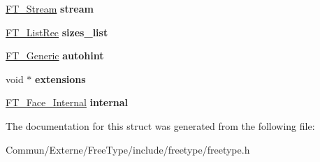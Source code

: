 \begin{DoxyCompactItemize}
\item 
\hyperlink{struct_f_t___stream_rec__}{F\+T\+\_\+\+Stream} {\bfseries stream}\hypertarget{struct_f_t___face_rec___a831d5da25cd0fe2a783d2a73f467de55}{}\label{struct_f_t___face_rec___a831d5da25cd0fe2a783d2a73f467de55}

\item 
\hyperlink{struct_f_t___list_rec__}{F\+T\+\_\+\+List\+Rec} {\bfseries sizes\+\_\+list}\hypertarget{struct_f_t___face_rec___a47504203e02bfba59c802c35cb4009ed}{}\label{struct_f_t___face_rec___a47504203e02bfba59c802c35cb4009ed}

\item 
\hyperlink{struct_f_t___generic__}{F\+T\+\_\+\+Generic} {\bfseries autohint}\hypertarget{struct_f_t___face_rec___a34ba9b1367f1b2d13676043b8da3ea73}{}\label{struct_f_t___face_rec___a34ba9b1367f1b2d13676043b8da3ea73}

\item 
void $\ast$ {\bfseries extensions}\hypertarget{struct_f_t___face_rec___a8b24f993e38da597d3e0273267890f49}{}\label{struct_f_t___face_rec___a8b24f993e38da597d3e0273267890f49}

\item 
\hyperlink{struct_f_t___face___internal_rec__}{F\+T\+\_\+\+Face\+\_\+\+Internal} {\bfseries internal}\hypertarget{struct_f_t___face_rec___aed9a1267cddcbe790f0591471c886537}{}\label{struct_f_t___face_rec___aed9a1267cddcbe790f0591471c886537}

\end{DoxyCompactItemize}


The documentation for this struct was generated from the following file\+:\begin{DoxyCompactItemize}
\item 
Commun/\+Externe/\+Free\+Type/include/freetype/freetype.\+h\end{DoxyCompactItemize}
